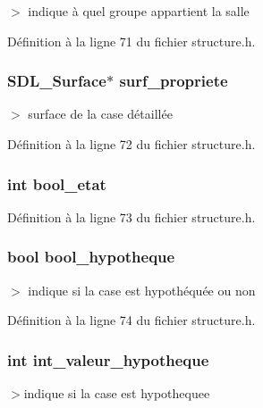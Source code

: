 $>$ indique \`{a} quel groupe appartient la salle 



D\'{e}finition \`{a} la ligne 71 du fichier structure.h.
\subsubsection{\setlength{\rightskip}{0pt plus 5cm}SDL\_\-Surface$\ast$ {\bf surf\_\-propriete}}\label{structcases_53156a5bfb684b6baa312d215af30777}


$>$ surface de la case d\'{e}taill\'{e}e 



D\'{e}finition \`{a} la ligne 72 du fichier structure.h.
\subsubsection{\setlength{\rightskip}{0pt plus 5cm}int {\bf bool\_\-etat}}\label{structcases_ebadd5993ff30f33d4cae99786e2ad1e}




D\'{e}finition \`{a} la ligne 73 du fichier structure.h.
\subsubsection{\setlength{\rightskip}{0pt plus 5cm}bool {\bf bool\_\-hypotheque}}\label{structcases_bdfbf58429b27fae7763920373212fdb}


$>$ indique si la case est hypoth\'{e}qu\'{e}e ou non 



D\'{e}finition \`{a} la ligne 74 du fichier structure.h.
\subsubsection{\setlength{\rightskip}{0pt plus 5cm}int {\bf int\_\-valeur\_\-hypotheque}}\label{structcases_890f6132b78dc7168614c28d4514f03f}


$>$indique si la case est hypothequee 



